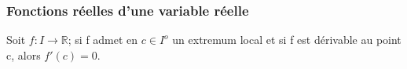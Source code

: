 %
\subsubsection{Fonctions réelles d'une variable réelle}
%
%
\begin{lem}
Soit $f : I \rightarrow \mathbb{R}$; si f admet en $c \in I^o$ un
extremum local et si f est dérivable au point c, alors $f'(c) = 0$.
\end{lem}
%
%
%
%
%
%
%
